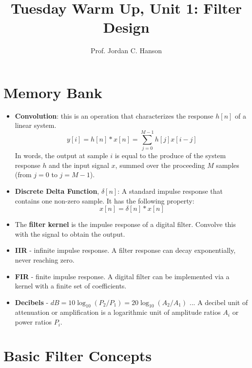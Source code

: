 \documentclass{article}
\begin{document}
\twocolumn

\title{Tuesday Warm Up, Unit 1: Filter Design}
\author{Prof. Jordan C. Hanson}
\maketitle

\section{Memory Bank}
\small
\begin{itemize}
\item \textbf{Convolution}: this is an operation that characterizes the response $h[n]$ of a linear system.
\begin{equation}
y[i] = h[n] * x[n] = \sum_{j=0}^{M-1}h[j]x[i-j] \label{eq:conv}
\end{equation}
In words, the output at sample $i$ is equal to the produce of the system response $h$ and the input signal $x$, summed over the proceeding $M$ samples (from $j=0$ to $j=M-1$).
\item \textbf{Discrete Delta Function}, $\delta[n]$: A standard impulse response that contains one non-zero sample.  It has the following property:
\begin{equation}
x[n] = \delta[n] * x[n] \label{eq:conv2}
\end{equation}
\item The \textbf{filter kernel} is the impulse response of a digital filter.  Convolve this with the signal to obtain the output.
\item \textbf{IIR} - infinite impulse response.  A filter response can decay exponentially, never reaching zero.
\item \textbf{FIR} - finite impulse response.  A digital filter can be implemented via a kernel with a finite set of coefficients.
\item \textbf{Decibels} - $dB = 10\log_{10}(P_2/P_1) = 20\log_{10}(A_2/A_1)$ ... A decibel unit of attenuation or amplification is a logarithmic unit of amplitude ratios $A_i$ or power ratios $P_i$.
\end{itemize}

\section{Basic Filter Concepts}
\end{document}
